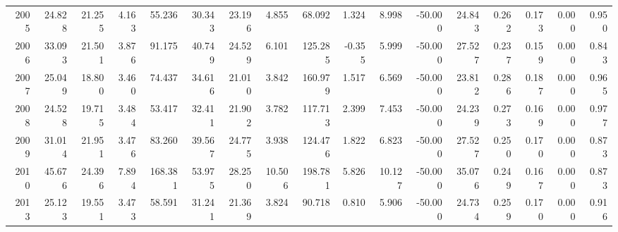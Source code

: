 \begin{tabular}{rrrrrrrrrrrrrrrrr}
2005 & 24.828 & 21.255 & 4.163 & 55.236 & 30.343 & 23.196 & 4.855 & 68.092 & 1.324 & 8.998 & -50.000 & 24.843 & 0.262 & 0.173 & 0.000 & 0.950 \\
2006 & 33.093 & 21.501 & 3.876 & 91.175 & 40.749 & 24.529 & 6.101 & 125.285 & -0.355 & 5.999 & -50.000 & 27.527 & 0.237 & 0.159 & 0.000 & 0.843 \\
2007 & 25.049 & 18.800 & 3.460 & 74.437 & 34.616 & 21.010 & 3.842 & 160.979 & 1.517 & 6.569 & -50.000 & 23.812 & 0.286 & 0.187 & 0.000 & 0.965 \\
2008 & 24.528 & 19.715 & 3.484 & 53.417 & 32.411 & 21.902 & 3.782 & 117.713 & 2.399 & 7.453 & -50.000 & 24.239 & 0.273 & 0.169 & 0.000 & 0.977 \\
2009 & 31.014 & 21.951 & 3.476 & 83.260 & 39.567 & 24.775 & 3.938 & 124.476 & 1.822 & 6.823 & -50.000 & 27.527 & 0.250 & 0.170 & 0.000 & 0.873 \\
2010 & 45.676 & 24.396 & 7.894 & 168.381 & 53.975 & 28.250 & 10.506 & 198.781 & 5.826 & 10.127 & -50.000 & 35.076 & 0.249 & 0.167 & 0.000 & 0.873 \\
2013 & 25.123 & 19.551 & 3.473 & 58.591 & 31.241 & 21.369 & 3.824 & 90.718 & 0.810 & 5.906 & -50.000 & 24.734 & 0.259 & 0.170 & 0.000 & 0.916 \\
\bottomrule
\end{tabular}
